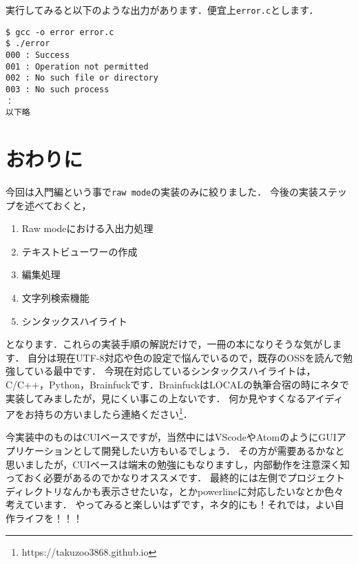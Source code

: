実行してみると以下のような出力があります．便宜上\texttt{error.c}とします．

\begin{verbatim}
$ gcc -o error error.c
$ ./error
000 : Success
001 : Operation not permitted
002 : No such file or directory
003 : No such process
：
以下略
\end{verbatim}

\newpage

\section{おわりに}
今回は入門編という事で\texttt{raw mode}の実装のみに絞りました．
今後の実装ステップを述べておくと，
\begin{enumerate}
\item Raw modeにおける入出力処理
\item テキストビューワーの作成
\item 編集処理
\item 文字列検索機能
\item シンタックスハイライト
\end{enumerate}
となります．これらの実装手順の解説だけで，一冊の本になりそうな気がします．
自分は現在UTF-8対応や色の設定で悩んでいるので，既存のOSSを読んで勉強している最中です．
今現在対応しているシンタックスハイライトは，C/C++，Python，Brainfuckです．BrainfuckはLOCALの執筆合宿の時にネタで実装してみましたが，見にくい事この上ないです．
何か見やすくなるアイディアをお持ちの方いましたら連絡ください\footnote{https://takuzoo3868.github.io}．

今実装中のものはCUIベースですが，当然中にはVScodeやAtomのようにGUIアプリケーションとして開発したい方もいるでしょう．
その方が需要あるかなと思いましたが，CUIベースは端末の勉強にもなりますし，内部動作を注意深く知っておく必要があるのでかなりオススメです．
最終的には左側でプロジェクトディレクトリなんかも表示させたいな，とかpowerlineに対応したいなとか色々考えています．
やってみると楽しいはずです，ネタ的にも！それでは，よい自作ライフを！！！
